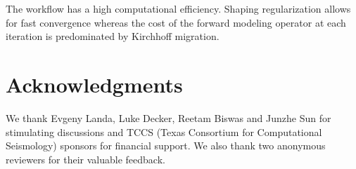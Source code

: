 The workflow has a high computational efficiency. Shaping regularization allows for fast convergence whereas the cost of the forward modeling operator
at each iteration is predominated by Kirchhoff migration. 



\section{Acknowledgments}

We thank Evgeny Landa, Luke Decker, Reetam Biswas and Junzhe Sun for stimulating discussions
and TCCS (Texas Consortium for Computational Seismology) sponsors for financial support.
We also thank two anonymous reviewers for their valuable feedback.




